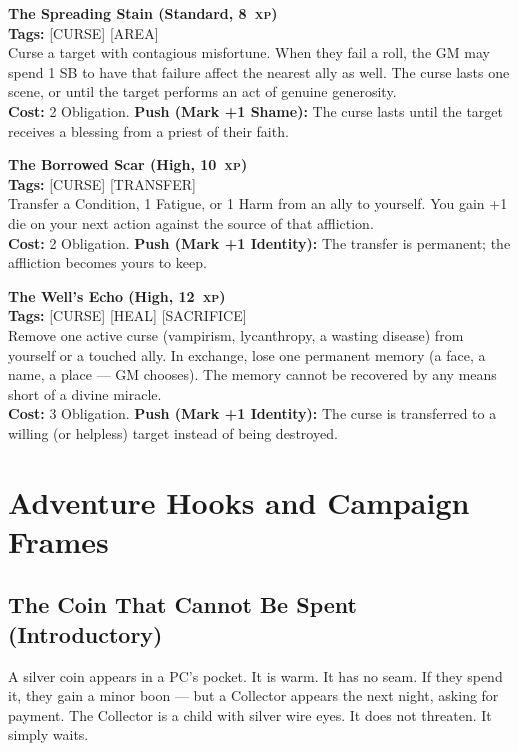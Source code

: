 \documentclass[10pt,twoside]{book}
\newcommand{\xp}[1]{#1~\textsc{xp}}
\begin{document}
\begin{ritestat}
\textbf{The Spreading Stain (Standard, \xp{8})} \\
\textbf{Tags:} [CURSE] [AREA] \\
Curse a target with contagious misfortune. When they fail a roll, the GM may spend 1 SB to have that failure affect the nearest ally as well. The curse lasts one scene, or until the target performs an act of genuine generosity. \\
\textbf{Cost:} 2 Obligation. \textbf{Push (Mark +1 Shame):} The curse lasts until the target receives a blessing from a priest of their faith.
\end{ritestat}

\begin{ritestat}
\textbf{The Borrowed Scar (High, \xp{10})} \\
\textbf{Tags:} [CURSE] [TRANSFER] \\
Transfer a Condition, 1 Fatigue, or 1 Harm from an ally to yourself. You gain +1 die on your next action against the source of that affliction. \\
\textbf{Cost:} 2 Obligation. \textbf{Push (Mark +1 Identity):} The transfer is permanent; the affliction becomes yours to keep.
\end{ritestat}

\begin{ritestat}
\textbf{The Well's Echo (High, \xp{12})} \\
\textbf{Tags:} [CURSE] [HEAL] [SACRIFICE] \\
Remove one active curse (vampirism, lycanthropy, a wasting disease) from yourself or a touched ally. In exchange, lose one permanent memory (a face, a name, a place --- GM chooses). The memory cannot be recovered by any means short of a divine miracle. \\
\textbf{Cost:} 3 Obligation. \textbf{Push (Mark +1 Identity):} The curse is transferred to a willing (or helpless) target instead of being destroyed.
\end{ritestat}

\chapter{Adventure Hooks and Campaign Frames}

\section{The Coin That Cannot Be Spent (Introductory)}
A silver coin appears in a PC's pocket. It is warm. It has no seam. If they spend it, they gain a minor boon --- but a Collector appears the next night, asking for payment. The Collector is a child with silver wire eyes. It does not threaten. It simply waits.
\end{document}
